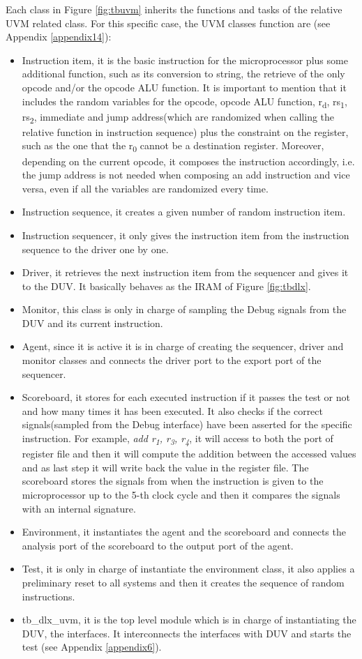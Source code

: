 Each class in Figure \ref{fig:tbuvm} inherits the functions and tasks of the relative UVM related class. For this specific case, the UVM classes function are (see Appendix \ref{appendix14}):
\begin{itemize}
\item Instruction item, it is the basic instruction for the microprocessor plus some additional function, such as its conversion to string, the retrieve of the only opcode and/or the opcode ALU function. It is important to mention that it includes the random variables for the opcode, opcode ALU function, r\textsubscript{d}, rs\textsubscript{1}, rs\textsubscript{2}, immediate and jump address(which are randomized when calling the relative function in instruction sequence) plus the constraint on the register, such as the one that the r\textsubscript{0} cannot be a destination register. Moreover, depending on the current opcode, it composes the instruction accordingly, i.e. the jump address is not needed when composing an add instruction and vice versa, even if all the variables are randomized every time.
\item Instruction sequence, it creates a given number of random instruction item.
\item Instruction sequencer, it only gives the instruction item from the instruction sequence to the driver one by one.
\item Driver, it retrieves the next instruction item from the sequencer and gives it to the DUV. It basically behaves as the IRAM of Figure \ref{fig:tbdlx}.
\item Monitor, this class is only in charge of sampling the Debug signals from the DUV and its current instruction.
\item Agent, since it is active it is in charge of creating the sequencer, driver and monitor classes and connects the driver port to the export port of the sequencer.
\item Scoreboard, it stores for each executed instruction if it passes the test or not and how many times it has been executed. It also checks if the correct signals(sampled from the Debug interface) have been asserted for the specific instruction. For example, \textit{add r\textsubscript{1}, r\textsubscript{3}, r\textsubscript{4}}, it will access to both the port of register file and then it will compute the addition between the accessed values and as last step it will write back the value in the register file. The scoreboard stores the signals from when the instruction is given to the microprocessor up to the 5-th clock cycle and then it compares the signals with an internal signature.
\item Environment, it instantiates the agent and the scoreboard and connects the analysis port of the scoreboard to the output port of the agent.
\item Test, it is only in charge of instantiate the environment class, it also applies a preliminary reset to all systems and then it creates the sequence of random instructions.
\item tb\_dlx\_uvm, it is the top level module which is in charge of instantiating the DUV, the interfaces. It interconnects the interfaces with DUV and starts the test (see Appendix \ref{appendix6}).
\end{itemize}